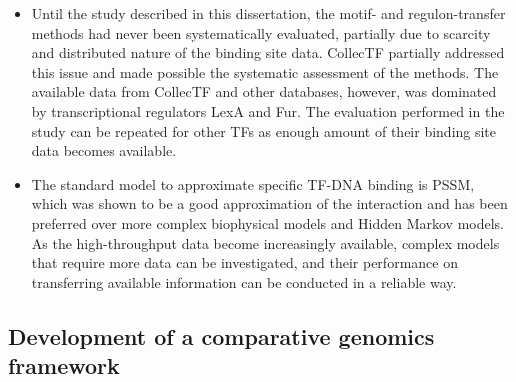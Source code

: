 \documentclass[12pt]{article}
\begin{document}
\begin{itemize}

\item Until the study described in this dissertation, the motif- and
  regulon-transfer methods had never been systematically evaluated, partially
  due to scarcity and distributed nature of the binding site data. CollecTF
  partially addressed this issue and made possible the systematic assessment of
  the methods. The available data from CollecTF and other databases, however,
  was dominated by transcriptional regulators LexA and Fur. The evaluation
  performed in the study can be repeated for other TFs as enough amount of
  their binding site data becomes available.

\item The standard model to approximate specific TF-DNA binding is PSSM, which
  was shown to be a good approximation of the interaction and has been
  preferred over more complex biophysical models and Hidden Markov models. As
  the high-throughput data become increasingly available, complex models that
  require more data can be investigated, and their performance on transferring
  available information can be conducted in a reliable way.
\end{itemize}

\subsection{Development of a comparative genomics framework}
\end{document}
